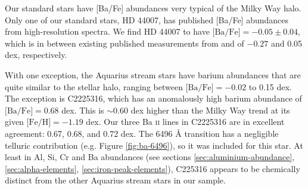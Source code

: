\documentclass{emulateapj}
\begin{document}
Our standard stars have [Ba/Fe] abundances very typical of the Milky Way halo. Only one of our standard stars, HD 44007, has published [Ba/Fe] abundances from high-resolution spectra. We find HD 44007 to have $\mbox{[Ba/Fe]} = -0.05 \pm 0.04$, which is in between existing published measurements from \citet{fulbright_2000} and \citet{burris;et-al_2000} of $-0.27$ and 0.05 dex, respectively. 

With one exception, the Aquarius stream stars have barium abundances that are quite similar to the stellar halo, ranging between $\mbox{[Ba/Fe]} = -0.02$ to 0.15 dex. The exception is C2225316, which has an anomalously high barium abundance of $\mbox{[Ba/Fe]} = 0.68$ dex. This is ${\sim}$0.60 dex higher than the Milky Way trend at its given $\mbox{[Fe/H]} = -1.19$ dex. Our three Ba \textsc{ii} lines in C2225316 are in excellent agreement: 0.67, 0.68, and 0.72 dex. The 6496 {\AA} transition has a negligible telluric contribution (e.g. Figure \ref{fig:ba-6496}), so it was included for this star. At least in Al, Si, Cr and Ba abundances (see sections \ref{sec:aluminium-abundance}, \ref{sec:alpha-elements}, \ref{sec:iron-peak-elements}), C225316 appears to be chemically distinct from the other Aquarius stream stars in our sample. 
\end{document}
